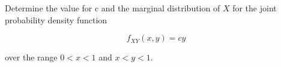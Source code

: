 Determine the value for c and the marginal distribution of $X$ for the joint probability density function

\[
    f_{XY}(x,y) = cy
\]

over the range $0 < x < 1$ and $x < y < 1$.